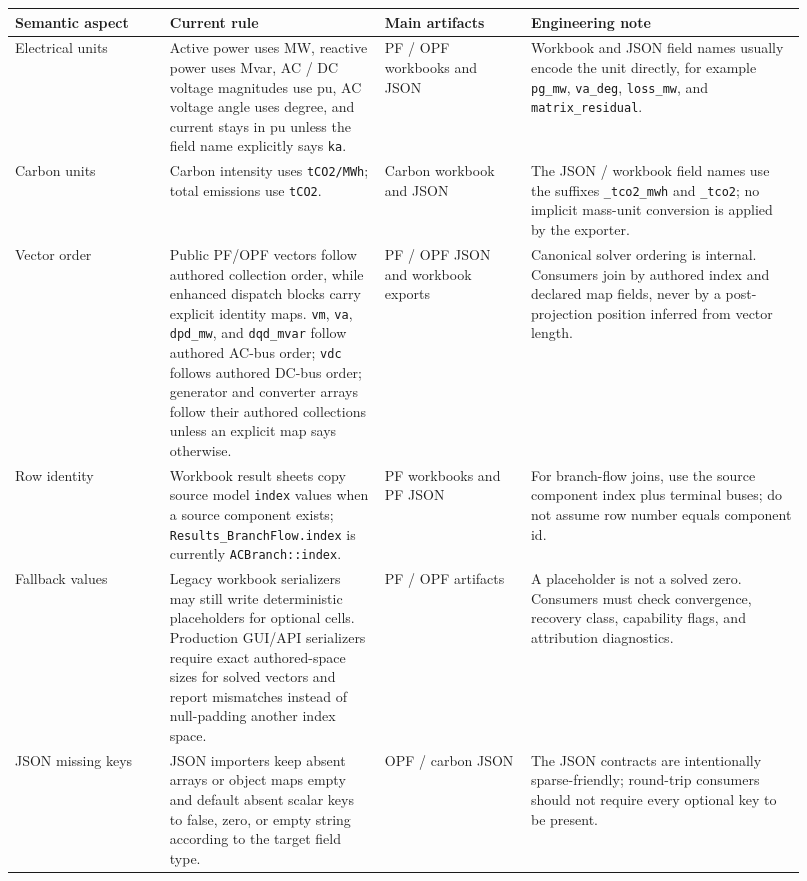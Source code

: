 \begin{longtable}{@{}L{0.18\linewidth}L{0.25\linewidth}L{0.17\linewidth}L{0.32\linewidth}@{}}
\toprule
Semantic aspect & Current rule & Main artifacts & Engineering note \\
\midrule
\endhead
Electrical units & Active power uses MW, reactive power uses Mvar, AC / DC voltage magnitudes use pu, AC voltage angle uses degree, and current stays in pu unless the field name explicitly says \texttt{ka}. & PF / OPF workbooks and JSON & Workbook and JSON field names usually encode the unit directly, for example \texttt{pg\_mw}, \texttt{va\_deg}, \texttt{loss\_mw}, and \texttt{matrix\_residual}. \\
Carbon units & Carbon intensity uses \texttt{tCO2/MWh}; total emissions use \texttt{tCO2}. & Carbon workbook and JSON & The JSON / workbook field names use the suffixes \texttt{\_tco2\_mwh} and \texttt{\_tco2}; no implicit mass-unit conversion is applied by the exporter. \\
Vector order & Public PF/OPF vectors follow authored collection order, while enhanced dispatch blocks carry explicit identity maps.  \texttt{vm}, \texttt{va}, \texttt{dpd\_mw}, and \texttt{dqd\_mvar} follow authored AC-bus order; \texttt{vdc} follows authored DC-bus order; generator and converter arrays follow their authored collections unless an explicit map says otherwise. & PF / OPF JSON and workbook exports & Canonical solver ordering is internal. Consumers join by authored index and declared map fields, never by a post-projection position inferred from vector length. \\
Row identity & Workbook result sheets copy source model \texttt{index} values when a source component exists; \texttt{Results\_BranchFlow.index} is currently \texttt{ACBranch::index}. & PF workbooks and PF JSON & For branch-flow joins, use the source component index plus terminal buses; do not assume row number equals component id. \\
Fallback values & Legacy workbook serializers may still write deterministic placeholders for optional cells. Production GUI/API serializers require exact authored-space sizes for solved vectors and report mismatches instead of null-padding another index space. & PF / OPF artifacts & A placeholder is not a solved zero. Consumers must check convergence, recovery class, capability flags, and attribution diagnostics. \\
JSON missing keys & JSON importers keep absent arrays or object maps empty and default absent scalar keys to false, zero, or empty string according to the target field type. & OPF / carbon JSON & The JSON contracts are intentionally sparse-friendly; round-trip consumers should not require every optional key to be present. \\

\end{longtable}
